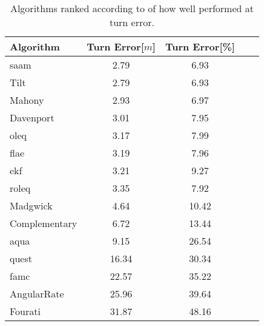 \begin{table}[H]
    \begin{center}
        \begin{tabular}[t]{lcccc}
            \hline
            Algorithm        & Turn Error[$m$] & Turn Error[\%] \\
            \hline
            \acrshort{saam}  & 2.79            & 6.93           \\
            Tilt             & 2.79            & 6.93           \\
            Mahony           & 2.93            & 6.97           \\
            Davenport        & 3.01            & 7.95           \\
            \acrshort{oleq}  & 3.17            & 7.99           \\
            \acrshort{flae}  & 3.19            & 7.96           \\
            \acrshort{ekf}   & 3.21            & 9.27           \\
            \acrshort{roleq} & 3.35            & 7.92           \\
            Madgwick         & 4.64            & 10.42          \\
            Complementary    & 6.72            & 13.44          \\
            \acrshort{aqua}  & 9.15            & 26.54          \\
            \acrshort{quest} & 16.34           & 30.34          \\
            \acrshort{famc}  & 22.57           & 35.22          \\
            AngularRate      & 25.96           & 39.64          \\
            Fourati          & 31.87           & 48.16          \\
        \end{tabular}
        \caption{ Algorithms ranked according to of how well performed at turn error. }
        \label{tab:ranked_turn}
    \end{center}
\end{table}